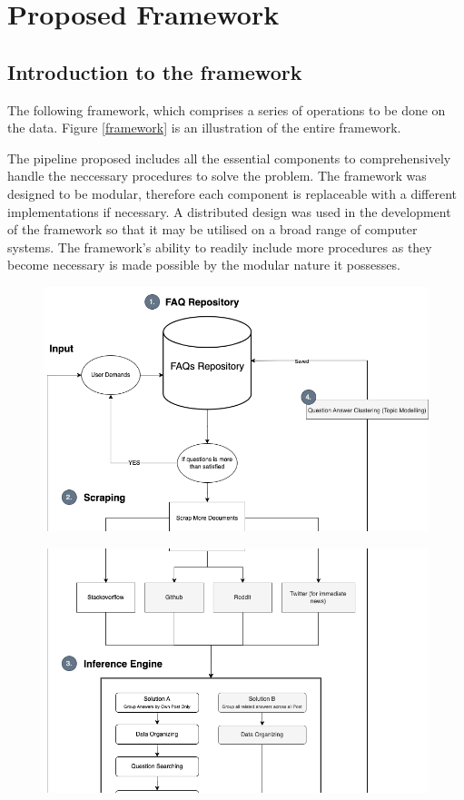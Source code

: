 \chapter{Proposed Framework}
\section{Introduction to the framework} 
The following framework, which comprises a series of operations to be done on the data. Figure \ref{framework} is an illustration of the entire framework.

The pipeline proposed includes all the essential components to comprehensively handle the neccessary procedures to solve the problem. The framework was designed to be modular, therefore each component is replaceable with a different implementations if necessary.  A distributed design was used in the development of the framework so that it may be utilised on a broad range of computer systems. The framework's ability to readily include more procedures as they become necessary is made possible by the modular nature it possesses.

\newpage
\begin{figure}[H]
  \centerline{\includegraphics[scale=0.5]{slice_framework_1.png}}
\end{figure} 

\begin{figure}[H]
  \centerline{\includegraphics[scale=0.5]{slice_framework_2.png}}
\end{figure} 

